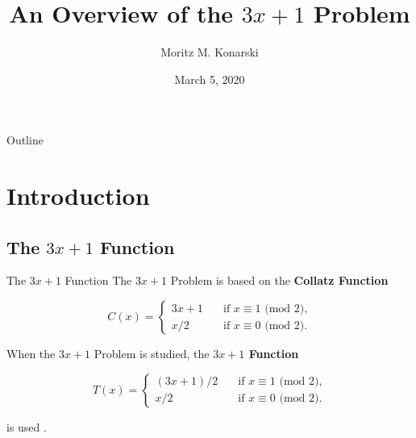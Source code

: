 \documentclass[hyperref={colorlinks,allcolors=black}]{beamer}
\title[$3x+1$ Problem]{An Overview of the $3x+1$ Problem}
\author[M. Konarski]{Moritz M. Konarski}
\institute[AUCA]{Applied Mathematics Department \newline 
    American University of Central Asia}
\date{March 5, 2020}
\begin{document}
\begin{frame}
  \titlepage
\end{frame}

\begin{frame}{Outline}
  \tableofcontents
\end{frame}


\section{Introduction}

\subsection[Function]{The $3x+1$ Function}


\begin{frame}{The $3x+1$ Function}
The $3x+1$ Problem is based on the \textbf{Collatz Function}
\cite{src:lagarias}

\begin{equation}
\nonumber
C(x)= \left\{
    \begin{array}{ll}
        3x+1 \quad &\text{if } x \equiv 1 \text{ (mod 2),} \\
        x/2 \quad &\text{if } x \equiv 0 \text{ (mod 2).}
    \end{array}
\right.
\end{equation}

When the $3x+1$ Problem is studied, the \textbf{$3x+1$ Function}

\begin{equation}
\nonumber
T(x)= \left\{
    \begin{array}{ll}
        (3x+1)/2 \quad &\text{if } x \equiv 1 \text{ (mod 2),} \\
        x/2 \quad &\text{if } x \equiv 0 \text{ (mod 2).}
    \end{array}
\right.
\end{equation}

is used \cite{src:lagarias}.
\end{frame}

\end{document}
